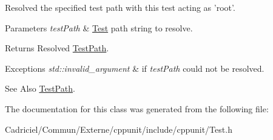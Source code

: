 Resolved the specified test path with this test acting as 'root'. 


\begin{DoxyParams}{Parameters}
{\em test\-Path} & \hyperlink{class_test}{Test} path string to resolve. \\
\hline
\end{DoxyParams}
\begin{DoxyReturn}{Returns}
Resolved \hyperlink{class_test_path}{Test\-Path}. 
\end{DoxyReturn}

\begin{DoxyExceptions}{Exceptions}
{\em std\-::invalid\-\_\-argument} & if {\itshape test\-Path} could not be resolved. \\
\hline
\end{DoxyExceptions}
\begin{DoxySeeAlso}{See Also}
\hyperlink{class_test_path}{Test\-Path}. 
\end{DoxySeeAlso}


The documentation for this class was generated from the following file\-:\begin{DoxyCompactItemize}
\item 
Cadriciel/\-Commun/\-Externe/cppunit/include/cppunit/Test.\-h\end{DoxyCompactItemize}
